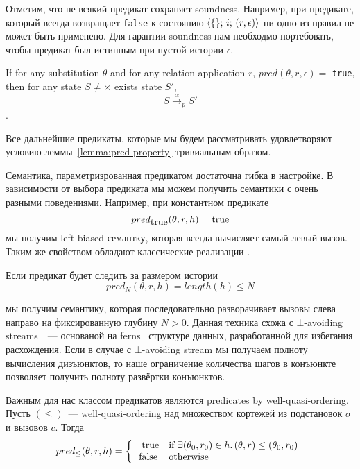 Отметим, что не всякий предикат сохраняет soundness. Например, при предикате, который всегда возвращает \lstinline{false} к состоянию $\langle \{\};\, i; \, (r, \epsilon) \rangle$ ни одно из правил не может быть применено. Для гарантии soundness нам необходмо портебовать, чтобы предикат был истинным при пустой истории $\epsilon$.

\begin{lemma}
\label{lemma:pred-property}
 If for any substitution $\theta$ and for any relation application $r$,  $pred(\theta, r, \epsilon) =$ \lstinline{true}, then for any state $S \not= \times$ exists state $S'$, 
 $$S \xrightarrow{\alpha}_p S'$$.
\end{lemma}

Все дальнейшие предикаты, которые мы будем рассматривать удовлетворяют условию леммы~\ref{lemma:pred-property} тривиальным образом.

Семантика, параметризрованная предикатом достаточна гибка в настройке. В зависимости от выбора предиката мы можем получить семантики с очень разными поведениями. Например, при константном предикате
\[
pred_{\mbox{\lstinline{true}}}(\theta, r, h) = \mbox{\lstinline{true}} 
\]
\noindent мы получим left-biased семантку, которая всегда вычисляет самый левый вызов. Таким же свойством обладают классические реализации \mk.

Если предикат будет следить за размером истории
\[
pred_N(\theta, r, h) =  length(h) \leq N
\]

\noindent мы получим семантику, которая последовательно разворачивает вызовы слева направо на фиксированную глубину $N > 0$. Данная техника схожа с $\bot$-avoiding streams~\cite{fair:WillThesis}~--- основаной на ferns~\cite{fair:ferns} структуре данных, разработанной для избегания расхождения. Если в случае с $\bot$-avoiding stream мы получаем полноту вычисления дизъюнктов, то наше ограничение количества шагов в конъюнкте позволяет получить полноту развёртки конъюнктов.

Важным для нас классом предикатов являются predicates by well-quasi-ordering. Пусть $(\leq)$~--- well-quasi-ordering над множеством кортежей из подстановок $\sigma$ и вызовов $c$. Тогда
\[
pred_\leq(\theta, r, h) = \left\{
\begin{array}{rl}
\mbox{\lstinline{true}}  & \mbox{if } \exists (\theta_0, r_0) \in h. \, (\theta, r) \leq (\theta_0, r_0) \\
\mbox{\lstinline{false}} & \mbox{otherwise}
\end{array}
\right.
\]

